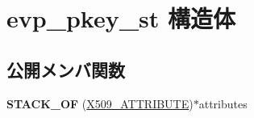 \hypertarget{structevp__pkey__st}{}\section{evp\+\_\+pkey\+\_\+st 構造体}
\label{structevp__pkey__st}
\subsection*{公開メンバ関数}
\begin{DoxyCompactItemize}
\item 
\hypertarget{structevp__pkey__st_a006f75f9d7bfba061b51a50727e45086}{}{\bfseries S\+T\+A\+C\+K\+\_\+\+O\+F} (\hyperlink{structx509__attributes__st}{X509\+\_\+\+A\+T\+T\+R\+I\+B\+U\+T\+E})$\ast$attributes\label{structevp__pkey__st_a006f75f9d7bfba061b51a50727e45086}

\end{DoxyCompactItemize}

